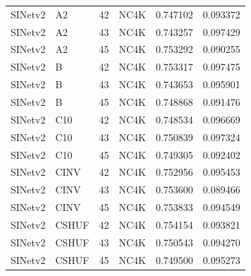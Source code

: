 \begin{table}[p]
\begin{center}
\begin{tabular}{llllcc}
SINetv2 & A2 & 42 & NC4K & 0.747102 & 0.093372 \\
SINetv2 & A2 & 43 & NC4K & 0.743257 & 0.097429 \\
SINetv2 & A2 & 45 & NC4K & 0.753292 & 0.090255 \\
SINetv2 & B & 42 & NC4K & 0.753317 & 0.097475 \\
SINetv2 & B & 43 & NC4K & 0.743653 & 0.095901 \\
SINetv2 & B & 45 & NC4K & 0.748868 & 0.091476 \\
SINetv2 & C10 & 42 & NC4K & 0.748534 & 0.096669 \\
SINetv2 & C10 & 43 & NC4K & 0.750839 & 0.097324 \\
SINetv2 & C10 & 45 & NC4K & 0.749305 & 0.092402 \\
SINetv2 & CINV & 42 & NC4K & 0.752956 & 0.095453 \\
SINetv2 & CINV & 43 & NC4K & 0.753600 & 0.089466 \\
SINetv2 & CINV & 45 & NC4K & 0.753833 & 0.094549 \\
SINetv2 & CSHUF & 42 & NC4K & 0.754154 & 0.093821 \\
SINetv2 & CSHUF & 43 & NC4K & 0.750543 & 0.094270 \\
SINetv2 & CSHUF & 45 & NC4K & 0.749500 & 0.095273 \\
\bottomrule
\end{tabular}
\end{center}
\end{table}
